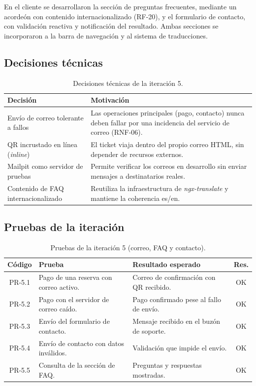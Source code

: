 En el cliente se desarrollaron la sección de preguntas frecuentes, mediante un acordeón con contenido internacionalizado (RF-20), y el formulario de contacto, con validación reactiva y notificación del resultado. Ambas secciones se incorporaron a la barra de navegación y al sistema de traducciones.

\subsection{Decisiones técnicas}

\begin{table}[h!]
\centering
\small
\begin{tabular}{|p{5.5cm}|p{8.5cm}|}
\hline
\textbf{Decisión} & \textbf{Motivación} \\ \hline
Envío de correo tolerante a fallos & Las operaciones principales (pago, contacto) nunca deben fallar por una incidencia del servicio de correo (RNF-06). \\ \hline
QR incrustado en línea (\textit{inline}) & El ticket viaja dentro del propio correo HTML, sin depender de recursos externos. \\ \hline
Mailpit como servidor de pruebas & Permite verificar los correos en desarrollo sin enviar mensajes a destinatarios reales. \\ \hline
Contenido de FAQ internacionalizado & Reutiliza la infraestructura de \textit{ngx-translate} y mantiene la coherencia es/en. \\ \hline
\end{tabular}
\caption{Decisiones técnicas de la iteración 5.}
\label{tab:dec-it5}
\end{table}

\subsection{Pruebas de la iteración}

\begin{table}[h!]
\centering
\small
\begin{tabular}{|c|p{6.5cm}|p{5cm}|c|}
\hline
\textbf{Código} & \textbf{Prueba} & \textbf{Resultado esperado} & \textbf{Res.} \\ \hline
PR-5.1 & Pago de una reserva con correo activo. & Correo de confirmación con QR recibido. & OK \\ \hline
PR-5.2 & Pago con el servidor de correo caído. & Pago confirmado pese al fallo de envío. & OK \\ \hline
PR-5.3 & Envío del formulario de contacto. & Mensaje recibido en el buzón de soporte. & OK \\ \hline
PR-5.4 & Envío de contacto con datos inválidos. & Validación que impide el envío. & OK \\ \hline
PR-5.5 & Consulta de la sección de FAQ. & Preguntas y respuestas mostradas. & OK \\ \hline
\end{tabular}
\caption{Pruebas de la iteración 5 (correo, FAQ y contacto).}
\label{tab:pruebas-it5}
\end{table}


